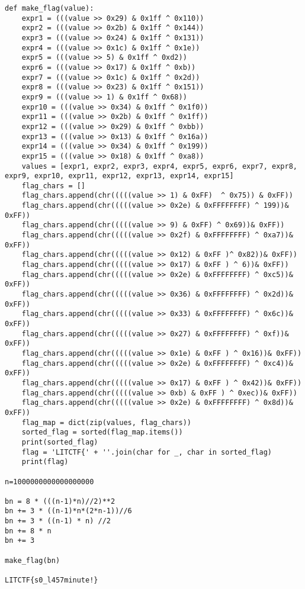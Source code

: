 \documentclass{article}
\begin{document}
\begin{verbatim}
def make_flag(value):
    expr1 = (((value >> 0x29) & 0x1ff ^ 0x110))
    expr2 = (((value >> 0x2b) & 0x1ff ^ 0x144))
    expr3 = (((value >> 0x24) & 0x1ff ^ 0x131))
    expr4 = (((value >> 0x1c) & 0x1ff ^ 0x1e))
    expr5 = (((value >> 5) & 0x1ff ^ 0xd2))
    expr6 = (((value >> 0x17) & 0x1ff ^ 0xb))
    expr7 = (((value >> 0x1c) & 0x1ff ^ 0x2d))
    expr8 = (((value >> 0x23) & 0x1ff ^ 0x151))
    expr9 = (((value >> 1) & 0x1ff ^ 0x68))
    expr10 = (((value >> 0x34) & 0x1ff ^ 0x1f0))
    expr11 = (((value >> 0x2b) & 0x1ff ^ 0x1ff))
    expr12 = (((value >> 0x29) & 0x1ff ^ 0xbb))
    expr13 = (((value >> 0x13) & 0x1ff ^ 0x16a))
    expr14 = (((value >> 0x34) & 0x1ff ^ 0x199))
    expr15 = (((value >> 0x18) & 0x1ff ^ 0xa8))
    values = [expr1, expr2, expr3, expr4, expr5, expr6, expr7, expr8, expr9, expr10, expr11, expr12, expr13, expr14, expr15]
    flag_chars = []
    flag_chars.append(chr(((((value >> 1) & 0xFF)  ^ 0x75)) & 0xFF))
    flag_chars.append(chr(((((value >> 0x2e) & 0xFFFFFFFF) ^ 199))& 0xFF))
    flag_chars.append(chr(((((value >> 9) & 0xFF) ^ 0x69))& 0xFF))
    flag_chars.append(chr(((((value >> 0x2f) & 0xFFFFFFFF) ^ 0xa7))& 0xFF))
    flag_chars.append(chr(((((value >> 0x12) & 0xFF )^ 0x82))& 0xFF))
    flag_chars.append(chr(((((value >> 0x17) & 0xFF ) ^ 6))& 0xFF))
    flag_chars.append(chr(((((value >> 0x2e) & 0xFFFFFFFF) ^ 0xc5))& 0xFF))
    flag_chars.append(chr(((((value >> 0x36) & 0xFFFFFFFF) ^ 0x2d))& 0xFF))
    flag_chars.append(chr(((((value >> 0x33) & 0xFFFFFFFF) ^ 0x6c))& 0xFF))
    flag_chars.append(chr(((((value >> 0x27) & 0xFFFFFFFF) ^ 0xf))& 0xFF))
    flag_chars.append(chr(((((value >> 0x1e) & 0xFF ) ^ 0x16))& 0xFF))
    flag_chars.append(chr(((((value >> 0x2e) & 0xFFFFFFFF) ^ 0xc4))& 0xFF))
    flag_chars.append(chr(((((value >> 0x17) & 0xFF ) ^ 0x42))& 0xFF))
    flag_chars.append(chr(((((value >> 0xb) & 0xFF ) ^ 0xec))& 0xFF))
    flag_chars.append(chr(((((value >> 0x2e) & 0xFFFFFFFF) ^ 0x8d))& 0xFF))
    flag_map = dict(zip(values, flag_chars))
    sorted_flag = sorted(flag_map.items())
    print(sorted_flag)
    flag = 'LITCTF{' + ''.join(char for _, char in sorted_flag)
    print(flag)

n=1000000000000000000

bn = 8 * (((n-1)*n)//2)**2
bn += 3 * ((n-1)*n*(2*n-1))//6
bn += 3 * ((n-1) * n) //2
bn += 8 * n
bn += 3

make_flag(bn)

LITCTF{s0_l457minute!}
\end{verbatim}
\end{document}
